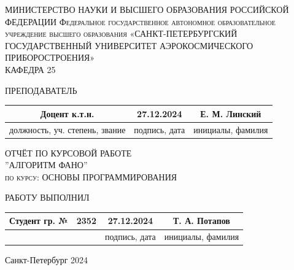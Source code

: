 \documentclass[12pt]{article}
\begin{document}
\begin{titlepage}
\newcommand{\HRule}{\rule{\linewidth}{0.2mm}}

\begin{center}
\textsc{ \centering МИНИСТЕРСТВО НАУКИ И ВЫСШЕГО ОБРАЗОВАНИЯ РОССИЙСКОЙ ФЕДЕРАЦИИ
Федеральное государственное автономное образовательное учреждение высшего образования
«САНКТ-ПЕТЕРБУРГСКИЙ ГОСУДАРСТВЕННЫЙ УНИВЕРСИТЕТ
АЭРОКОСМИЧЕСКОГО ПРИБОРОСТРОЕНИЯ»}\\[0.2cm]
\textsc{КАФЕДРА 25}\\[1cm]
\end{center}

ПРЕПОДАВАТЕЛЬ

\begin{table}[h]
\begin{center}
\begin{tabular}{|c|c|c|}
\hline
Доцент к.т.н. & 27.12.2024 & Е. М. Линский\\
\hline
должность, уч. степень, звание & подпись, дата & инициалы, фамилия\\
\hline
\end{tabular}
\end{center}
\end{table}

\begin{center}
\textsc{\Large{ОТЧЁТ ПО КУРСОВОЙ РАБОТЕ}}\\[0.5cm]
\textsc{\Large{''АЛГОРИТМ ФАНО''}}\\[2cm]
\textsc{по курсу: ОСНОВЫ ПРОГРАММИРОВАНИЯ}\\[3cm]
\end{center}

РАБОТУ ВЫПОЛНИЛ

\begin{table}[h]

\begin{center}
\begin{tabular}{|c|c|c|c|}
\hline
Студент гр. № & 2352 & 27.12.2024& Т. А. Потапов\\
\hline
& & подпись, дата & инициалы, фамилия \\
\hline
\end{tabular}
\end{center}
\end{table}

\begin{center}
{\large Санкт-Петербург 2024}
\end{center}
\end{titlepage}
\end{document}
